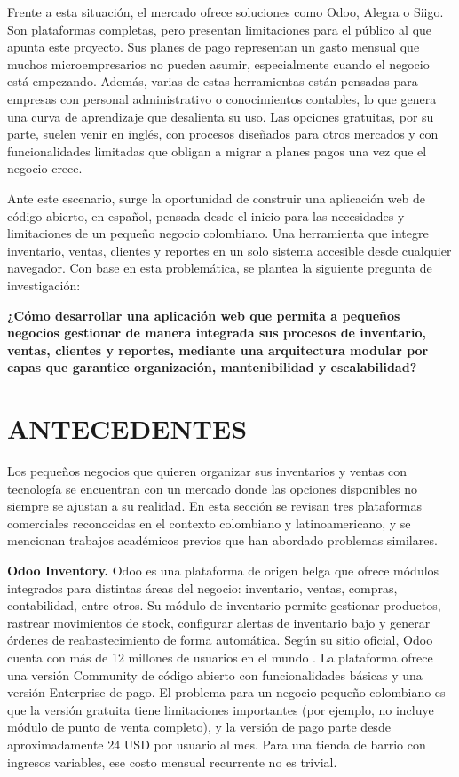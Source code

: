 \documentclass[spanish]{ieee_upb}
\begin{document}
Frente a esta situación, el mercado ofrece soluciones como Odoo, Alegra o Siigo. Son plataformas completas, pero presentan limitaciones para el público al que apunta este proyecto. Sus planes de pago representan un gasto mensual que muchos microempresarios no pueden asumir, especialmente cuando el negocio está empezando. Además, varias de estas herramientas están pensadas para empresas con personal administrativo o conocimientos contables, lo que genera una curva de aprendizaje que desalienta su uso. Las opciones gratuitas, por su parte, suelen venir en inglés, con procesos diseñados para otros mercados y con funcionalidades limitadas que obligan a migrar a planes pagos una vez que el negocio crece.

Ante este escenario, surge la oportunidad de construir una aplicación web de código abierto, en español, pensada desde el inicio para las necesidades y limitaciones de un pequeño negocio colombiano. Una herramienta que integre inventario, ventas, clientes y reportes en un solo sistema accesible desde cualquier navegador. Con base en esta problemática, se plantea la siguiente pregunta de investigación:

\textbf{¿Cómo desarrollar una aplicación web que permita a pequeños negocios gestionar de manera integrada sus procesos de inventario, ventas, clientes y reportes, mediante una arquitectura modular por capas que garantice organización, mantenibilidad y escalabilidad?}

\newpage
\section{ANTECEDENTES}

Los pequeños negocios que quieren organizar sus inventarios y ventas con tecnología se encuentran con un mercado donde las opciones disponibles no siempre se ajustan a su realidad. En esta sección se revisan tres plataformas comerciales reconocidas en el contexto colombiano y latinoamericano, y se mencionan trabajos académicos previos que han abordado problemas similares.

\textbf{Odoo Inventory.} Odoo es una plataforma de origen belga que ofrece módulos integrados para distintas áreas del negocio: inventario, ventas, compras, contabilidad, entre otros. Su módulo de inventario permite gestionar productos, rastrear movimientos de stock, configurar alertas de inventario bajo y generar órdenes de reabastecimiento de forma automática. Según su sitio oficial, Odoo cuenta con más de 12 millones de usuarios en el mundo \cite{odoo}. La plataforma ofrece una versión Community de código abierto con funcionalidades básicas y una versión Enterprise de pago. El problema para un negocio pequeño colombiano es que la versión gratuita tiene limitaciones importantes (por ejemplo, no incluye módulo de punto de venta completo), y la versión de pago parte desde aproximadamente 24 USD por usuario al mes. Para una tienda de barrio con ingresos variables, ese costo mensual recurrente no es trivial.
\end{document}
